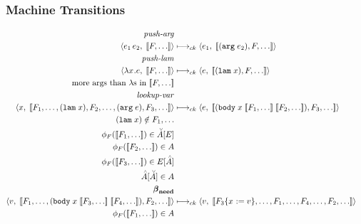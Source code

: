 \documentclass{article}
\begin{document}
\subsubsection*{Machine Transitions}
\begin{align*}
  \tag*{\textit{push-arg}} \\
  \ckFs{\ap{\e_1}{\e_2}} &\ckstep \cke[_1]{\consFss{\argFe[_2]}} \\
  \tag*{\textit{push-lam}} \\
  \ckFs{\lxe} &\ckstep \cke{\consFss{\lxF}} \\
  \textrm{more args than }\lambda\textrm{s in } \Fss \\
  \tag*{\textit{lookup-var}} \\
  \ck{x}{\appendFss{\Fs[_1]}
                   {\appendFs{\consFs[_2]{\lxF}}
                             {\consFs[_3]{\argFe}}}}
    &\ckstep
  \cke{\consFss[_3]{\bodyFx{\Fss[_1]}{\Fss[_2]}}} \\
  \lxF \notin \Fs[_1] \\
  \buildF{\Fss[_1]} \in \inAm{\E} \\
  \buildF{\Fss[_2]} \in \A \\
  \buildF{\Fss[_3]} \in \inE{\Ap} \\
  \inAp{\Am} \in A \\
  \tag*{$\betaneednr$} \\
  \ck{\val}{\appendFss{\Fs[_1]}
                   {\consFs[_2]{\bodyFx{\Fss[_3]}{\Fss[_4]}}}}
    &\ckstep
  \ck{\val}{\appendFss{\Fs[\substx{_3}{\val}]}
                      {\Fs[_1],\Fs[_4],\Fs[_2]}} \\
  \buildF{\Fss[_1]} \in \A
\end{align*}
\end{document}
